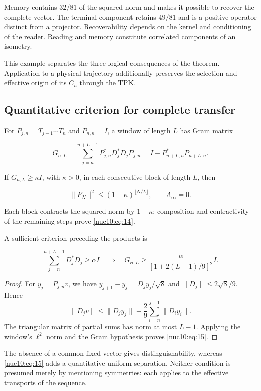 Memory contains \(32/81\) of the squared norm and makes it possible to recover the complete vector. The terminal component retains \(49/81\) and is a positive operator distinct from a projector. Recoverability depends on the kernel and conditioning of the reader. Reading and memory constitute correlated components of an isometry.

This example separates the three logical consequences of the theorem. Application to a physical trajectory additionally preserves the selection and effective origin of its \(C_n\) through the TPK.

\subsection{Quantitative criterion for complete transfer}

For \(P_{j,n}=T_{j-1}\cdots T_n\) and \(P_{n,n}=I\), a window of length \(L\) has Gram matrix

\[
G_{n,L}=\sum_{j=n}^{n+L-1}P_{j,n}^*D_j^*D_jP_{j,n}
=I-P_{n+L,n}^*P_{n+L,n}.
\]

If \(G_{n,L}\geq\kappa I\), with \(\kappa>0\), in each consecutive block of length \(L\), then

\begin{equation}
\|P_N\|^2\le(1-\kappa)^{\lfloor N/L\rfloor},\qquad A_\infty=0.
\label{nuc10:eq:14}
\end{equation}

Each block contracts the squared norm by \(1-\kappa\); composition and contractivity of the remaining steps prove \eqref{nuc10:eq:14}.

A sufficient criterion preceding the products is

\begin{equation}
\sum_{j=n}^{n+L-1}D_j^*D_j\ge\alpha I
\quad\Longrightarrow\quad
G_{n,L}\ge\frac{\alpha}{[1+2(L-1)/9]^2}I.
\label{nuc10:eq:15}
\end{equation}

\begin{proof}
For \(y_j=P_{j,n}v\), we have \(y_{j+1}-y_j=D_jy_j/\sqrt8\) and \(\|D_j\|\leq2\sqrt8/9\). Hence
\[
\|D_jv\|\leq\|D_jy_j\|+\frac29\sum_{i=n}^{j-1}\|D_iy_i\|.
\]
The triangular matrix of partial sums has norm at most \(L-1\). Applying the window's \(\ell^2\) norm and the Gram hypothesis proves \eqref{nuc10:eq:15}.

\end{proof}

The absence of a common fixed vector gives distinguishability, whereas \eqref{nuc10:eq:15} adds a quantitative uniform separation. Neither condition is presumed merely by mentioning symmetries: each applies to the effective transports of the sequence.

